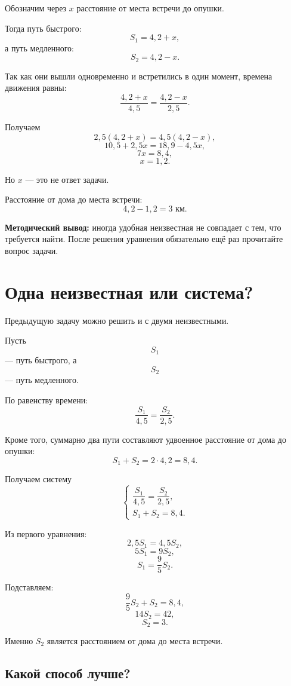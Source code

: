 \documentclass[a4paper,12pt]{article}
\newcommand{\key}[1]{\textcolor{darkaccent}{\textbf{#1}}}
\begin{document}
Обозначим через \(x\) расстояние от места встречи до опушки.

Тогда путь быстрого:
\[
S_1=4{,}2+x,
\]
а путь медленного:
\[
S_2=4{,}2-x.
\]

Так как они вышли одновременно и встретились в один момент,
времена движения равны:
\[
\frac{4{,}2+x}{4{,}5}
=
\frac{4{,}2-x}{2{,}5}.
\]

Получаем
\[
2{,}5(4{,}2+x)
=
4{,}5(4{,}2-x),
\]
\[
10{,}5+2{,}5x
=
18{,}9-4{,}5x,
\]
\[
7x=8{,}4,
\]
\[
x=1{,}2.
\]

Но \(x\) --- это не ответ задачи.

Расстояние от дома до места встречи:
\[
4{,}2-1{,}2=3\text{ км}.
\]

\key{Методический вывод:}
иногда удобная неизвестная не совпадает с тем, что требуется найти.
После решения уравнения обязательно ещё раз прочитайте вопрос задачи.


\section{Одна неизвестная или система?}

Предыдущую задачу можно решить и с двумя неизвестными.

Пусть
\[
S_1
\]
--- путь быстрого,
а
\[
S_2
\]
--- путь медленного.

По равенству времени:
\[
\frac{S_1}{4{,}5}
=
\frac{S_2}{2{,}5}.
\]

Кроме того, суммарно два пути составляют удвоенное расстояние
от дома до опушки:
\[
S_1+S_2=2\cdot4{,}2=8{,}4.
\]

Получаем систему
\[
\begin{cases}
\dfrac{S_1}{4{,}5}=\dfrac{S_2}{2{,}5},\\[0.7em]
S_1+S_2=8{,}4.
\end{cases}
\]

Из первого уравнения:
\[
2{,}5S_1=4{,}5S_2,
\]
\[
5S_1=9S_2,
\]
\[
S_1=\frac95S_2.
\]

Подставляем:
\[
\frac95S_2+S_2=8{,}4,
\]
\[
14S_2=42,
\]
\[
S_2=3.
\]

Именно \(S_2\) является расстоянием от дома до места встречи.

\subsection*{Какой способ лучше?}
\end{document}
